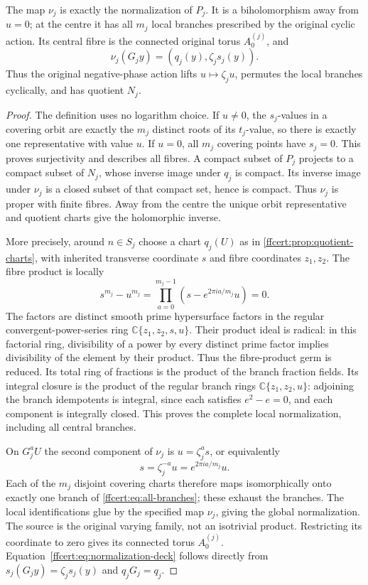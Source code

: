 \begin{theorem}
\label{ffcert:thm:normalization}
The map $\nu_j$ is exactly the normalization of $P_j$. It is a
biholomorphism away from $u=0$; at the centre it has all $m_j$ local
branches prescribed by the original cyclic action. Its central fibre
is the connected original torus $A_0^{(j)}$, and
\[
 \nu_j(G_jy)=(q_j(y),\zeta_js_j(y)).
 \tag{FF27}\label{ffcert:eq:normalization-deck}
\]
Thus the original negative-phase action lifts $u\mapsto\zeta_ju$,
permutes the local branches cyclically, and has quotient $N_j$.
\end{theorem}

\begin{proof}
The definition uses no logarithm choice. If $u\ne0$, the $s_j$-values
in a covering orbit are exactly the $m_j$ distinct roots of its
$t_j$-value, so there is exactly one representative with value $u$.
If $u=0$, all $m_j$ covering points have $s_j=0$. This proves
surjectivity and describes all fibres. A compact subset of $P_j$
projects to a compact subset of $N_j$, whose inverse image under
$q_j$ is compact. Its inverse image under $\nu_j$ is a closed subset
of that compact set, hence is compact. Thus $\nu_j$ is proper with
finite fibres. Away from the centre the unique orbit representative
and quotient charts give the holomorphic inverse.

More precisely, around $n\in S_j$ choose a chart $q_j(U)$ as in
\cref{ffcert:prop:quotient-charts}, with inherited transverse coordinate
$s$ and fibre coordinates $z_1,z_2$. The fibre product is locally
\[
 s^{m_j}-u^{m_j}
   =\prod_{a=0}^{m_j-1}(s-e^{2\pi ia/m_j}u)=0.
 \tag{FF28}\label{ffcert:eq:all-branches}
\]
The factors are distinct smooth prime hypersurface factors in the
regular convergent-power-series ring $\mathbb C\{z_1,z_2,s,u\}$.
Their product ideal is radical: in this factorial ring, divisibility
of a power by every distinct prime factor implies divisibility of the
element by their product. Thus the fibre-product germ is reduced.
Its total ring of fractions is the product of the branch fraction
fields. Its integral closure is the product of the regular branch
rings $\mathbb C\{z_1,z_2,u\}$: adjoining the branch idempotents is
integral, since each satisfies $e^2-e=0$, and each component is
integrally closed. This proves the complete local normalization,
including all central branches.

On $G_j^aU$ the second component of $\nu_j$ is $u=\zeta_j^a s$,
or equivalently
\[
 s=\zeta_j^{-a}u=e^{2\pi ia/m_j}u.
 \tag{FF29}\label{ffcert:eq:branch-identification}
\]
Each of the $m_j$ disjoint covering charts therefore maps
isomorphically onto exactly one branch of
\eqref{ffcert:eq:all-branches}; these exhaust the branches. The
local identifications glue by the specified map $\nu_j$, giving the
global normalization. The source is the original varying family,
not an isotrivial product. Restricting its coordinate to zero gives
its connected torus $A_0^{(j)}$. Equation~\eqref{ffcert:eq:normalization-deck}
follows directly from $s_j(G_jy)=\zeta_js_j(y)$ and $q_jG_j=q_j$.
\end{proof}

